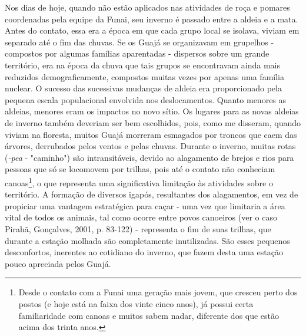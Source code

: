 Nos dias de hoje, quando não estão aplicados nas atividades de roça e
pomares coordenadas pela equipe da Funai, seu inverno é passado entre a
aldeia e a mata. Antes do contato, essa era a época em que cada grupo
local se isolava, viviam em separado até o fim das chuvas. Se os Guajá
se organizavam em grupelhos - compostos por algumas famílias aparentadas
- dispersos sobre um grande território, era na época da chuva que tais
grupos se encontravam ainda mais reduzidos demograficamente, compostos
muitas vezes por apenas uma família nuclear. O sucesso das sucessivas
mudanças de aldeia era proporcionado pela pequena escala populacional
envolvida nos deslocamentos. Quanto menores as aldeias, menores eram os
impactos no novo sítio. Os lugares para as novas aldeias de inverno
também deveriam ser bem escolhidos, pois, como me disseram, quando
viviam na floresta, muitos Guajá morreram esmagados por troncos que caem
das árvores, derrubados pelos ventos e pelas chuvas. Durante o inverno,
muitas rotas (\emph{-pea} - "caminho") são intransitáveis, devido ao
alagamento de brejos e rios para pessoas que só se locomovem por
trilhas, pois até o contato não conheciam canoas\footnote{Desde o
  contato com a Funai uma geração mais jovem, que cresceu perto dos
  postos (e hoje está na faixa dos vinte cinco anos), já possui certa
  familiaridade com canoas e muitos sabem nadar, diferente dos que estão
  acima dos trinta anos.}, o que representa uma significativa limitação
às atividades sobre o território. A formação de diversos igapós,
resultantes dos alagamentos, em vez de propiciar uma vantagem
estratégica para caçar - uma vez que limitaria a área vital de todos os
animais, tal como ocorre entre povos canoeiros (ver o caso Pirahã,
Gonçalves, 2001, p. 83-122) - representa o fim de suas trilhas, que
durante a estação molhada são completamente inutilizadas. São esses
pequenos desconfortos, inerentes ao cotidiano do inverno, que fazem
desta uma estação pouco apreciada pelos Guajá.

